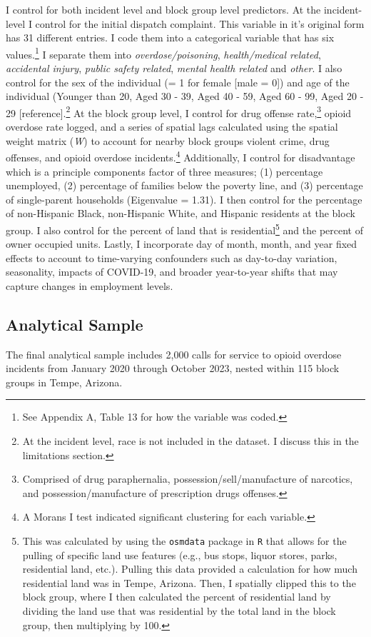 I control for both incident level and block group level predictors. At the incident-level I control for the initial dispatch complaint. This variable in it's original form has 31 different entries. I code them into a categorical variable that has six values.\footnote{See Appendix A, Table 13 for how the variable was coded.} I separate them into \textit{overdose/poisoning}, \textit{health/medical related}, \textit{accidental injury}, \textit{public safety related}, \textit{mental health related} and \textit{other}. I also control for the sex of the individual (= 1 for female [male = 0]) and age of the individual (Younger than 20, Aged 30 - 39, Aged 40 - 59, Aged 60 - 99, Aged 20 - 29 [reference].\footnote{At the incident level, race is not included in the dataset. I discuss this in the limitations section.} At the block group level, I control for drug offense rate,\footnote{Comprised of drug paraphernalia, possession/sell/manufacture of narcotics, and possession/manufacture of prescription drugs offenses.} opioid overdose rate logged, and a series of spatial lags calculated using the spatial weight matrix (\textit{W}) to account for nearby block groups violent crime, drug offenses, and opioid overdose incidents.\footnote{A Morans I test indicated significant clustering for each variable.} Additionally, I control for disadvantage which is a principle components factor of three measures; (1) percentage unemployed, (2) percentage of families below the poverty line, and (3) percentage of single-parent households (Eigenvalue = 1.31). I then control for the percentage of non-Hispanic Black, non-Hispanic White, and Hispanic residents at the block group. I also control for the percent of land that is residential\footnote{This was calculated by using the \texttt{osmdata} package in \texttt{R} that allows for the pulling of specific land use features (e.g., bus stops, liquor stores, parks, residential land, etc.). Pulling this data provided a calculation for how much residential land was in Tempe, Arizona. Then, I spatially clipped this to the block group, where I then calculated the percent of residential land by dividing the land use that was residential by the total land in the block group, then multiplying by 100.} and the percent of owner occupied units. Lastly, I incorporate day of month, month, and year fixed effects to account to time-varying confounders such as day-to-day variation, seasonality, impacts of COVID-19, and broader year-to-year shifts that may capture changes in employment levels.

\subsection{Analytical Sample}
The final analytical sample includes 2,000 calls for service to opioid overdose incidents from January 2020 through October 2023, nested within 115 block groups in Tempe, Arizona.


